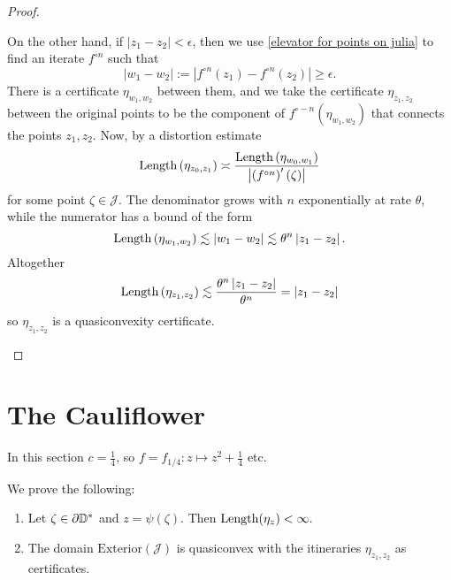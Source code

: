 \begin{proof}
\begin{enumerate}[label=(\roman*)]
On the other hand, if $\left|z_{1}-z_{2}\right|<\epsilon$, then
we use  \cref{elevator for points on julia} to find an iterate $f^{\circ n}$ such that 
\begin{equation}
	|w_1-w_2|:=\left|f^{\circ n}(z_{1})-f^{\circ n}(z_{2})\right|\geq\epsilon.
\end{equation}
There is a certificate $\eta_{w_1,w_2}$
between them, and we take the certificate $\eta_{z_{1},z_{2}}$ between the original points to be the component of $f^{\circ-n}\left(\eta_{w_1,w_2}\right)$
that connects the points $z_{1},z_{2}$. Now, by a distortion estimate
\begin{equation*}
\operatorname{Length}\left(\eta_{z_{0},z_{1}}\right)\asymp\frac{\operatorname{Length}\left(\eta_{w_0,w_1}\right)}{\left|\left(f^{\circ n}\right)'\left(\zeta\right)\right|}
\end{equation*}
 for some point $\zeta \in \mathcal{J}$. The denominator grows
with $n$ exponentially at rate $\theta$, while the numerator has
a bound of the form 
\[
\operatorname{Length}\left(\eta_{w_1,w_2}\right)\lesssim\left|w_1-w_2\right|\lesssim\theta^{n}\left|z_{1}-z_{2}\right|.
\]
Altogether 
\[
\operatorname{Length}\left(\eta_{z_{1},z_{2}}\right)\lesssim\frac{\theta^{n}\left|z_{1}-z_{2}\right|}{\theta^{n}}=\left|z_{1}-z_{2}\right|
\]
 so $\eta_{z_{1},z_{2}}$ is a quasiconvexity certificate.
\end{enumerate}
\end{proof}

\section{The Cauliflower}
In this section $c=\frac 14$, so $f=f_{1/4}: z\mapsto z^2+ \frac 14$ etc.

We prove the following:
\begin{theorem} \label{quasiconvex-cauliflower}
	\begin{enumerate}[label=(\roman*)]
	\item Let $\zeta\in\partial{\mathbb{D}^*}$ and $z=\psi(\zeta)$. Then 
$	\operatorname{Length}(\eta_z)<\infty.$
	
     \item The domain $\mathrm{Exterior}(\mathcal{J})$ is quasiconvex with the itineraries $\eta_{z_1,z_2}$ as certificates.
\end{enumerate}
\end{theorem}

